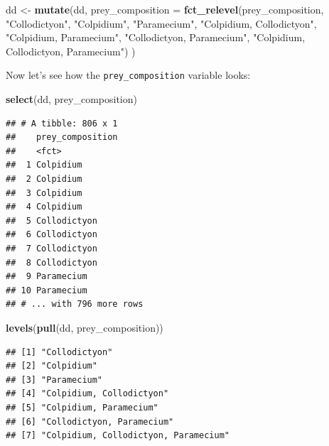 \documentclass[]{book}
\newenvironment{Shaded}{\begin{snugshade}}{\end{snugshade}}
\newcommand{\DataTypeTok}[1]{\textcolor[rgb]{0.13,0.29,0.53}{#1}}
\newcommand{\KeywordTok}[1]{\textcolor[rgb]{0.13,0.29,0.53}{\textbf{#1}}}
\newcommand{\NormalTok}[1]{#1}
\newcommand{\StringTok}[1]{\textcolor[rgb]{0.31,0.60,0.02}{#1}}
\begin{document}
\begin{Shaded}
\begin{Highlighting}[]
\NormalTok{dd <-}\StringTok{ }\KeywordTok{mutate}\NormalTok{(dd,}
             \DataTypeTok{prey_composition =} \KeywordTok{fct_relevel}\NormalTok{(prey_composition,}
                                            \StringTok{"Collodictyon"}\NormalTok{,}
                                            \StringTok{"Colpidium"}\NormalTok{,}
                                            \StringTok{"Paramecium"}\NormalTok{,}
                                            \StringTok{"Colpidium, Collodictyon"}\NormalTok{,}
                                            \StringTok{"Colpidium, Paramecium"}\NormalTok{,}
                                            \StringTok{"Collodictyon, Paramecium"}\NormalTok{,}
                                            \StringTok{"Colpidium, Collodictyon, Paramecium"}\NormalTok{)}
\NormalTok{                                            )}
\end{Highlighting}
\end{Shaded}

Now let's see how the \texttt{prey\_composition} variable looks:

\begin{Shaded}
\begin{Highlighting}[]
\KeywordTok{select}\NormalTok{(dd, prey_composition)}
\end{Highlighting}
\end{Shaded}

\begin{verbatim}
## # A tibble: 806 x 1
##    prey_composition
##    <fct>           
##  1 Colpidium       
##  2 Colpidium       
##  3 Colpidium       
##  4 Colpidium       
##  5 Collodictyon    
##  6 Collodictyon    
##  7 Collodictyon    
##  8 Collodictyon    
##  9 Paramecium      
## 10 Paramecium      
## # ... with 796 more rows
\end{verbatim}

\begin{Shaded}
\begin{Highlighting}[]
\KeywordTok{levels}\NormalTok{(}\KeywordTok{pull}\NormalTok{(dd, prey_composition))}
\end{Highlighting}
\end{Shaded}

\begin{verbatim}
## [1] "Collodictyon"                       
## [2] "Colpidium"                          
## [3] "Paramecium"                         
## [4] "Colpidium, Collodictyon"            
## [5] "Colpidium, Paramecium"              
## [6] "Collodictyon, Paramecium"           
## [7] "Colpidium, Collodictyon, Paramecium"
\end{verbatim}
\end{document}
